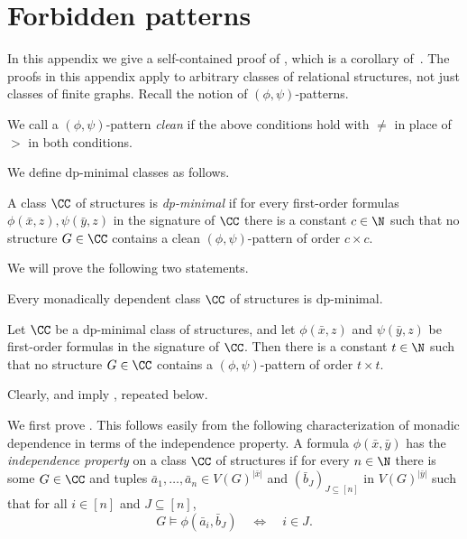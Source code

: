 
\section{Forbidden patterns}\label{sec:forbidden-patterns}
\label{app:patterns}

In this appendix we give a self-contained proof of , which is a corollary of~\cite[Lemma~C.1]{ordered-tww}. The proofs in this appendix apply to arbitrary classes of relational structures, not just classes of finite graphs.
Recall the notion of $(\phi,\psi)$-patterns.

\noindent We call a $(\phi,\psi)$-pattern \emph{clean} if the above conditions hold with $\neq$ in place of $>$ in both conditions.

We define dp-minimal classes  \cite{DolichGoodrickLippel2011} as follows.
\begin{definition}
A class $\CC$ of structures is \emph{dp-minimal}
if for every first-order formulas $\phi(\bar x,z),\psi(\bar y,z)$ in the signature of $\CC$ there is a constant $c\in\N$ such that no structure $G\in\CC$ contains a clean $(\phi,\psi)$-pattern of order $c\times c$.
\end{definition}

We will prove the following two statements.
\begin{lemma}\label{lem:mondep-dpmin}
    Every monadically dependent class $\CC$ of structures is dp-minimal.
\end{lemma}

\begin{lemma}\label{lem:dpmin-phipsi-patterns}
    Let $\CC$ be a dp-minimal class of structures, and let $\phi(\bar x,z)$ and $\psi(\bar y,z)$ be first-order formulas in the signature of $\CC$. Then there is a constant $t\in\N$ such that no structure $G\in\CC$ contains a $(\phi,\psi)$-pattern of order $t\times t$.
\end{lemma}

Clearly,  and  imply , repeated below.
\lemphipsi*

We first prove . This follows easily
from the following characterization of monadic dependence in terms of the independence property.
A formula $\phi(\bar x,\bar y)$ has the \emph{independence property} on a class $\CC$ of structures if for every $n\in\N$ there is some $G\in \CC$ and tuples $\bar a_1,\ldots,\bar a_n\in V(G)^{|\bar x|}$ and $(\bar b_J)_{J\subseteq[n]}$ in $V(G)^{|\bar y|}$ such that for all $i\in[n]$ and $J\subseteq[n]$,
\[
    G\models\phi(\bar a_i,\bar b_J)
    \quad\Longleftrightarrow\quad
    i\in J.
\]

